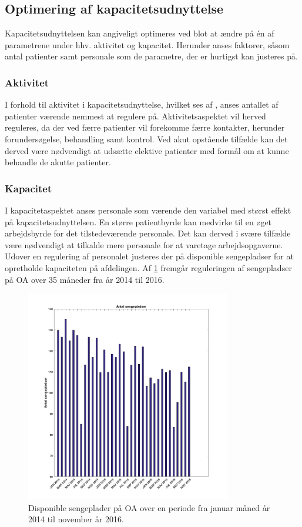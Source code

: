 \subsection{Optimering af kapacitetsudnyttelse}
Kapacitetsudnyttelsen kan angiveligt optimeres ved blot at ændre på én af parametrene under hhv. aktivitet og kapacitet. Herunder anses faktorer, såsom antal patienter samt personale som de parametre, der er hurtigst kan justeres på. 

\subsubsection{Aktivitet}
I forhold til aktivitet i kapacitetsudnyttelse, hvilket ses af , anses antallet af patienter værende nemmest at regulere på. Aktivitetsaspektet vil herved reguleres, da der ved færre patienter vil forekomme færre kontakter, herunder forundersøgelse, behandling
samt kontrol. Ved akut opstående tilfælde kan det derved være nødvendigt at udsætte elektive patienter med formål om at kunne behandle de akutte patienter. 


\subsubsection{Kapacitet}
I kapacitetaspektet anses personale som værende den variabel med størst effekt på kapacitetsudnyttelsen. En større patientbyrde kan medvirke til en øget arbejdsbyrde for det tilstedeværende personale. Det kan derved i svære tilfælde være nødvendigt at tilkalde mere personale for at varetage arbejdsopgaverne. 
Udover en regulering af personalet justeres der på disponible sengepladser for at opretholde kapaciteten på afdelingen. Af \ref{fig:sengepladser} fremgår reguleringen af sengepladser på OA over 35 måneder fra år 2014 til 2016.

\begin{figure}[H] 
\begin{center}
\includegraphics[width=0.8\textwidth]{figures/sengepladser}
\end{center}
\caption{Disponible sengeplader på OA over en periode fra januar måned år 2014 til november år 2016.} 
\label{fig:sengepladser} 
\end{figure}

